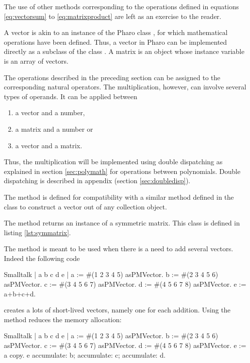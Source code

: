 The use of other methods corresponding to the operations defined
in equations \ref{eq:vectorsum} to \ref{eq:matrixproduct} are left
as an exercise to the reader.

 A vector is akin to an instance of the
Pharo class , for which mathematical operations
have been defined.
Thus, a vector in Pharo can be implemented directly as a subclass of the class .
A matrix is an object whose instance variable is an array of vectors.

The operations described in the preceding section can be assigned
to the corresponding natural operators. The multiplication,
however, can involve several types of operands. It can be applied
between
\begin{enumerate}
  \item a vector and a number,
  \item a matrix and a number or
  \item a vector and a matrix.
\end{enumerate}
Thus, the multiplication will be implemented using double
dispatching as explained in section \ref{sec:polymath} for
operations between polynomials. Double dispatching is described in
appendix (\cf section \ref{sec:doubledisp}).

The method  is defined for compatibility with a similar method defined in the class  to construct a vector out of any collection object.

The method  returns an instance of a symmetric matrix.
This class is defined in listing \ref{lst:symmatrix}.

The method  is meant to be used when there is a
need to add several vectors.
Indeed the following code
\begin{displaycode}{Smalltalk}
| a b c d e |
a := #(1 2 3 4 5) asPMVector.
b := #(2 3 4 5 6) asPMVector.
c := #(3 4 5 6 7) asPMVector.
d := #(4 5 6 7 8) asPMVector.
e := a+b+c+d.
\end{displaycode}
creates a lots of short-lived vectors, namely one
for each addition.
Using the method  reduces the memory allocation:
\begin{displaycode}{Smalltalk}
| a b c d e |
a := #(1 2 3 4 5) asPMVector.
b := #(2 3 4 5 6) asPMVector.
c := #(3 4 5 6 7) asPMVector.
d := #(4 5 6 7 8) asPMVector.
e := a copy.
e accumulate: b; accumulate: c; accumulate: d.
\end{displaycode}

